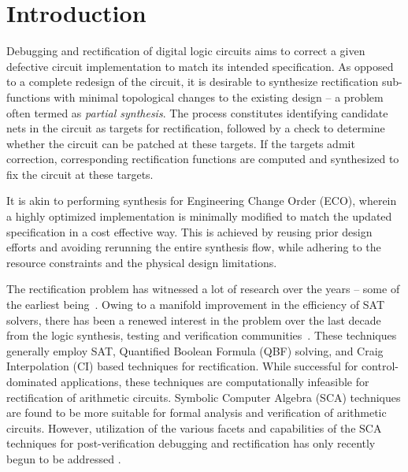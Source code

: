 \section{Introduction}
\par Debugging and rectification of digital logic circuits aims to correct
a given defective circuit implementation to match its intended
specification. As opposed to a complete redesign of the circuit, it
is desirable to synthesize rectification sub-functions with
minimal topological changes to the existing design -- a problem
often termed as {\it partial synthesis}. 
The process constitutes identifying
candidate nets in the circuit as targets for rectification, followed by  
a check to determine whether the circuit can be patched at these
targets. 
If the targets admit correction, corresponding rectification
functions are computed and synthesized to fix the circuit at these targets.
  
It is akin to performing synthesis for Engineering Change Order 
(ECO), wherein a highly optimized implementation is minimally modified to match the 
updated specification in a cost effective way. This is achieved by reusing prior design 
efforts and avoiding rerunning the entire synthesis flow, while adhering to the resource 
constraints and the physical design limitations.

The rectification problem has witnessed a lot of research over the years -- 
some of the earliest being~\cite{Sadowska:DAC95,scholl:1,andreas:2005}.
Owing to a manifold improvement in the efficiency of SAT solvers,
there has been a renewed interest in the problem over the last decade from 
the logic synthesis, testing and verification communities~\cite{
MF_Huang:DATE12,scholl:2,SS_Fujita:ISQED17,SS_Alan:DAC18}.
These techniques generally employ SAT, Quantified Boolean Formula (QBF) solving,
and Craig Interpolation (CI) based techniques for rectification. While
successful for control-dominated applications, these techniques are
computationally infeasible for rectification of arithmetic circuits.
Symbolic Computer Algebra (SCA) techniques are found to be more
suitable for formal analysis and verification of arithmetic circuits.
However, utilization of the various facets and capabilities of the SCA
techniques for post-verification debugging and rectification has only
recently begun to be addressed
\cite{farimah:2017:1,MF_Rolf:ISVLSI18,Utkarsh:VLSI18,
Vkrao:FMCAD18,Utkarsh:ETS19,Vkrao:ISQED21,Vkrao:GLSVLSI21}. 



